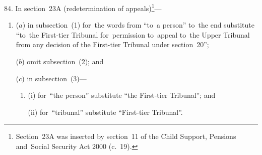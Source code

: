 \documentclass[12pt,a4paper]{article}
\begin{document}
\medskip

84.  In section~23A (redetermination of appeals)\footnote{Section~23A was inserted by section~11 of the Child Support, Pensions and~Social Security Act 2000 (c.~19).}—
\begin{enumerate}\item[]
($a$) in subsection~(1) for~the words from “to~a person” to~the end substitute “to~the First-tier Tribunal for~permission to~appeal to~the Upper Tribunal from any decision of the First-tier Tribunal under section~20”;

($b$) omit subsection~(2); and

($c$) in subsection~(3)—
\begin{enumerate}\item[]
(i) for~“the person” substitute “the First-tier Tribunal”; and

(ii) for~“tribunal” substitute “First-tier Tribunal”.
\end{enumerate}
\end{enumerate}

\medskip
\end{document}
